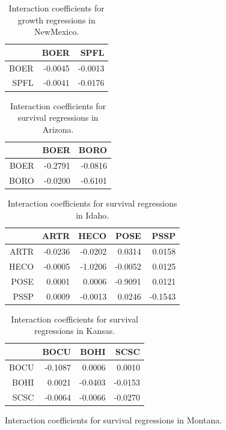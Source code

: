 \documentclass[12pt,]{article}
\begin{document}
\begin{table}[ht]
\end{table}\begin{table}[ht]
\centering
\caption{Interaction coefficients for growth regressions in NewMexico.} 
\begin{tabular}{rrr}
  \hline
 & BOER & SPFL \\ 
  \hline
BOER & -0.0045 & -0.0013 \\ 
  SPFL & -0.0041 & -0.0176 \\ 
   \hline
\end{tabular}
\end{table}\begin{table}[ht]
\centering
\caption{Interaction coefficients for survival regressions in Arizona.} 
\begin{tabular}{rrr}
  \hline
 & BOER & BORO \\ 
  \hline
BOER & -0.2791 & -0.0816 \\ 
  BORO & -0.0200 & -0.6101 \\ 
   \hline
\end{tabular}
\end{table}\begin{table}[ht]
\centering
\caption{Interaction coefficients for survival regressions in Idaho.} 
\begin{tabular}{rrrrr}
  \hline
 & ARTR & HECO & POSE & PSSP \\ 
  \hline
ARTR & -0.0236 & -0.0202 & 0.0314 & 0.0158 \\ 
  HECO & -0.0005 & -1.0206 & -0.0052 & 0.0125 \\ 
  POSE & 0.0001 & 0.0006 & -0.9091 & 0.0121 \\ 
  PSSP & 0.0009 & -0.0013 & 0.0246 & -0.1543 \\ 
   \hline
\end{tabular}
\end{table}\begin{table}[ht]
\centering
\caption{Interaction coefficients for survival regressions in Kansas.} 
\begin{tabular}{rrrr}
  \hline
 & BOCU & BOHI & SCSC \\ 
  \hline
BOCU & -0.1087 & 0.0006 & 0.0010 \\ 
  BOHI & 0.0021 & -0.0403 & -0.0153 \\ 
  SCSC & -0.0064 & -0.0066 & -0.0270 \\ 
   \hline
\end{tabular}
\end{table}\begin{table}[ht]
\centering
\caption{Interaction coefficients for survival regressions in Montana.} 

\end{table}
\end{document}
